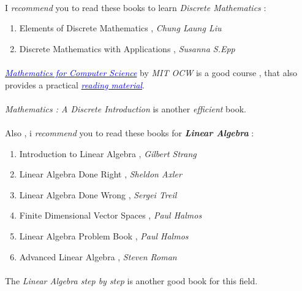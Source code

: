 \documentclass[12pt, a4paper]{article}
\begin{document}
\paragraph{}
I \emph{recommend} you to read these books to learn \emph{Discrete Mathematics} :
\begin{enumerate}
	\item Elements of Discrete Mathematics , \emph{\large{Chung Laung Liu}}
	\item Discrete Mathematics with Applications , \emph{\large{Susanna S.Epp}}
\end{enumerate}

\paragraph{}
\href{https://ocw.mit.edu/courses/electrical-engineering-and-computer-science/6-042j-mathematics-for-computer-science-spring-2015/}{\textcolor{blue}{\emph{Mathematics for Computer Science}}} by \emph{MIT OCW} is a good course , that also provides a practical \href{https://courses.csail.mit.edu/6.042}{\textcolor{blue}{\emph{reading material}}}.

\paragraph{}
\emph{Mathematics : A Discrete Introduction} is another \emph{efficient} book.

\paragraph{}
Also , i \emph{recommend} you to read these books for \textbf{\emph{Linear Algebra}} :
\begin{enumerate}
	\item Introduction to Linear Algebra , \emph{\large{Gilbert Strang}}
	\item Linear Algebra Done Right ,  \emph{\large{Sheldon Axler}}
	\item Linear Algebra Done Wrong , \emph{\large{Sergei Treil}\\}
	\item Finite Dimensional Vector Spaces , \emph{\large{Paul Halmos}}
	\item Linear Algebra Problem Book , \emph{\large{Paul Halmos}}
	\item Advanced Linear Algebra , \emph{\large{Steven Roman}}
\end{enumerate}
\paragraph{}
The \emph{Linear Algebra step by step} is another good book for this field.
\end{document}
